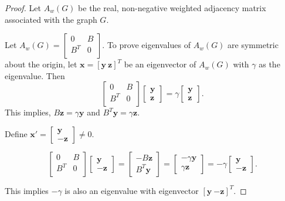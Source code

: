 \documentclass[10pt,a4paper]{amsart}
\begin{document}
\begin{proof}
Let $A_w(G)$ be the real, non-negative weighted adjacency matrix associated with the graph $G.$ 
	
Let $A_w(G)=\begin{bmatrix}
0 & B\\
B^T & 0\\
\end{bmatrix}.$ To prove eigenvalues of $A_w(G)$ are symmetric about the origin,	let $\mathbf{x}=[\mathbf{y}\ \mathbf{z}]^{T}$ be an eigenvector of $A_{w}(G)$ with $\gamma$ as the eigenvalue. Then $$\begin{bmatrix}
		0 & B\\
		B^{T} & 0\\
	\end{bmatrix}\begin{bmatrix}
		\mathbf{y}\\\mathbf{z}
	\end{bmatrix}=\gamma \begin{bmatrix}
		\mathbf{y}\\\mathbf{z}
	\end{bmatrix}.$$
	This implies, $B\mathbf{z}=\gamma \mathbf{y}$ and $B^T \mathbf{y}=\gamma \mathbf{z}.$
	
	Define $\mathbf{x'}=\begin{bmatrix}
		\mathbf{y} \\\mathbf{-z}
	\end{bmatrix}\neq 0.$
	
	$$\begin{bmatrix}
		0 & B\\
		B^{T} & 0\\
	\end{bmatrix}\begin{bmatrix}
		\mathbf{y}\\\mathbf{-z}
	\end{bmatrix}=\begin{bmatrix}
		-B\mathbf{z}\\B^{T}\mathbf{y}
	\end{bmatrix}=\begin{bmatrix}
		-\gamma \mathbf{y}\\\gamma
        \mathbf{z}
	\end{bmatrix}=-\gamma \begin{bmatrix}
		\mathbf{y}\\\mathbf{-z}
	\end{bmatrix}.$$
	
	This implies $-\gamma$ is also an eigenvalue with eigenvector $[\mathbf{y}\ \mathbf{-z}]^{T}.$


\end{proof}
\end{document}
